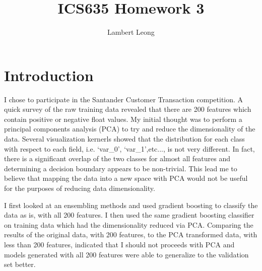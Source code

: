 \documentclass[11pt,letterpaper]{article}
\newcommand{\homework}[2]{
\setcounter{section}{#1}
\section*{ICS635 Homework {\thesection}: {#2} }
{\markboth{#2}{#2}}
}
\begin{document}
\title{ICS635 Homework 3}
\author{Lambert Leong}
\maketitle
\section{Introduction}
I chose to participate in the Santander Customer Transaction competition.  A
quick survey of the raw training data revealed that there are 200 features which
contain positive or negative float values.  My initial thought was to perform a
principal components analysis (PCA) to try and reduce the dimensionality of the
data.  Several visualization kernerls showed that the distribution for each
class with respect to each field, i.e. `var\_0', `var\_1',etc..., is not very
different.  In fact, there is a significant overlap of the two classes for
almost all features and determining a decision boundary appears to be non-trivial.
This lead me to believe that mapping the data into a new space with PCA would
not be useful for the purposes of reducing data dimensionality.


I first looked at an ensembling methods and used gradient boosting to classify
the data as is, with all 200 features.  I then used the same gradient boosting
classifier on training data which had the dimensionality reduced via PCA.
Comparing the results of the original data, with 200 features, to the PCA
transformed data, with less than 200 features, indicated that I should not
proceeds with PCA and models generated with all 200 features were able to
generalize to the validation set better.

\end{document}
